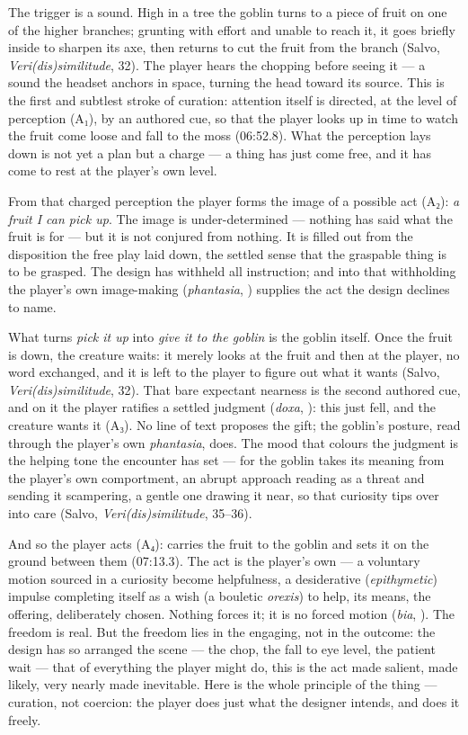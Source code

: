 The trigger is a sound. High in a tree the goblin turns to a piece of fruit on one of the higher branches; grunting with effort and unable to reach it, it goes briefly inside to sharpen its axe, then returns to cut the fruit from the branch (Salvo, \textit{Veri(dis)similitude}, 32). The player hears the chopping before seeing it — a sound the headset anchors in space, turning the head toward its source. This is the first and subtlest stroke of curation: attention itself is directed, at the level of perception (A₁), by an authored cue, so that the player looks up in time to watch the fruit come loose and fall to the moss (06:52.8). What the perception lays down is not yet a plan but a charge — a thing has just come free, and it has come to rest at the player's own level.

From that charged perception the player forms the image of a possible act (A₂): \textit{a fruit I can pick up}. The image is under-determined — nothing has said what the fruit is for — but it is not conjured from nothing. It is filled out from the disposition the free play laid down, the settled sense that the graspable thing is to be grasped. The design has withheld all instruction; and into that withholding the player's own image-making (\textit{phantasia}, ) supplies the act the design declines to name.

What turns \textit{pick it up} into \textit{give it to the goblin} is the goblin itself. Once the fruit is down, the creature waits: it merely looks at the fruit and then at the player, no word exchanged, and it is left to the player to figure out what it wants (Salvo, \textit{Veri(dis)similitude}, 32). That bare expectant nearness is the second authored cue, and on it the player ratifies a settled judgment (\textit{doxa}, ): this just fell, and the creature wants it (A₃). No line of text proposes the gift; the goblin's posture, read through the player's own \textit{phantasia}, does. The mood that colours the judgment is the helping tone the encounter has set — for the goblin takes its meaning from the player's own comportment, an abrupt approach reading as a threat and sending it scampering, a gentle one drawing it near, so that curiosity tips over into care (Salvo, \textit{Veri(dis)similitude}, 35–36).

And so the player acts (A₄): carries the fruit to the goblin and sets it on the ground between them (07:13.3). The act is the player's own — a voluntary motion sourced in a curiosity become helpfulness, a desiderative (\textit{epithymetic}) impulse completing itself as a wish (a bouletic \textit{orexis}) to help, its means, the offering, deliberately chosen. Nothing forces it; it is no forced motion (\textit{bia}, ). The freedom is real. But the freedom lies in the engaging, not in the outcome: the design has so arranged the scene — the chop, the fall to eye level, the patient wait — that of everything the player might do, this is the act made salient, made likely, very nearly made inevitable. Here is the whole principle of the thing — curation, not coercion: the player does just what the designer intends, and does it freely.

